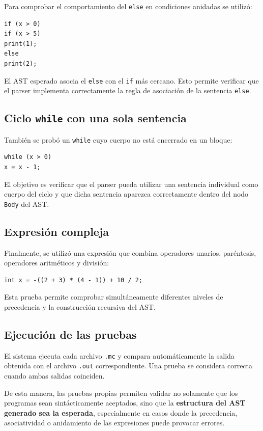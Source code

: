 \documentclass[12pt,letterpaper]{article}
\begin{document}
Para comprobar el comportamiento del \texttt{else} en condiciones anidadas se utilizó:

\begin{verbatim}
if (x > 0)
if (x > 5)
print(1);
else
print(2);
\end{verbatim}

El AST esperado asocia el \texttt{else} con el \texttt{if} más cercano. Esto permite verificar que el parser implementa correctamente la regla de asociación de la sentencia \texttt{else}.

\subsection*{Ciclo \texttt{while} con una sola sentencia}

También se probó un \texttt{while} cuyo cuerpo no está encerrado en un bloque:

\begin{verbatim}
while (x > 0)
x = x - 1;
\end{verbatim}

El objetivo es verificar que el parser pueda utilizar una sentencia individual como cuerpo del ciclo y que dicha sentencia aparezca correctamente dentro del nodo \texttt{Body} del AST.

\subsection*{Expresión compleja}

Finalmente, se utilizó una expresión que combina operadores unarios, paréntesis, operadores aritméticos y división:

\begin{verbatim}
int x = -((2 + 3) * (4 - 1)) + 10 / 2;
\end{verbatim}

Esta prueba permite comprobar simultáneamente diferentes niveles de precedencia y la construcción recursiva del AST.

\subsection*{Ejecución de las pruebas}
El sistema ejecuta cada archivo \texttt{.mc} y compara automáticamente la salida obtenida con el archivo \texttt{.out} correspondiente. Una prueba se considera correcta cuando ambas salidas coinciden.

De esta manera, las pruebas propias permiten validar no solamente que los programas sean sintácticamente aceptados, sino que la \textbf{estructura del AST generado sea la esperada}, especialmente en casos donde la precedencia, asociatividad o anidamiento de las expresiones puede provocar errores.
\end{document}
